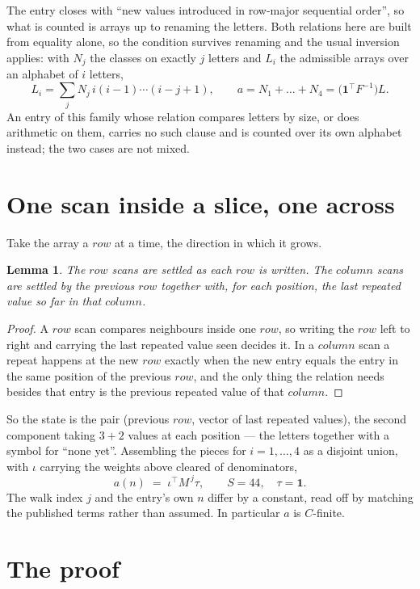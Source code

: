 \documentclass[11pt,a4paper]{article}
\theoremstyle{plain}
\newtheorem{lemma}[theorem]{Lemma}
\theoremstyle{definition}
\begin{document}
The entry closes with ``new values introduced in row-major sequential order'', so what is
counted is arrays up to renaming the letters. Both relations here are built from equality
alone, so the condition survives renaming and the usual inversion applies: with $N_j$ the
classes on exactly $j$ letters and $L_i$ the admissible arrays over an alphabet of $i$ letters,
\[
L_i=\sum_j N_j\,i(i-1)\cdots(i-j+1),\qquad
a=N_1+\dots+N_{4}=\bigl(\mathbf{1}^{\!\top}F^{-1}\bigr)L .
\]
An entry of this family whose relation compares letters by size, or does arithmetic on them,
carries no such clause and is counted over its own alphabet instead; the two cases are not
mixed.

\section{One scan inside a slice, one across}

Take the array a $row$ at a time, the direction in which it grows.

\begin{lemma}\label{lem:state}
The $row$ scans are settled as each $row$ is written. The $column$ scans are
settled by the previous $row$ together with, for each position, the last repeated value
so far in that $column$.
\end{lemma}

\begin{proof}
A $row$ scan compares neighbours inside one $row$, so writing the
$row$ left to right and carrying the last repeated value seen decides it. In a
$column$ scan a repeat happens at the new $row$ exactly when the new entry equals the
entry in the same position of the previous $row$, and the only thing the relation needs
besides that entry is the previous repeated value of that $column$.
\end{proof}

So the state is the pair (previous $row$, vector of last repeated values), the second
component taking $3+2$ values at each position --- the letters together with a symbol for
``none yet''. Assembling the pieces for $i=1,\dots,4$ as a disjoint union, with $\iota$ carrying the weights above cleared of denominators,
\[
a(n)\;=\;\iota^{\!\top}M^{\,j}\tau ,\qquad S=44,\quad\tau=\mathbf{1} .
\]
The walk index $j$ and the entry's own $n$ differ by a constant, read off by matching the
published terms rather than assumed. In particular $a$ is $C$-finite.

\section{The proof}
\end{document}
